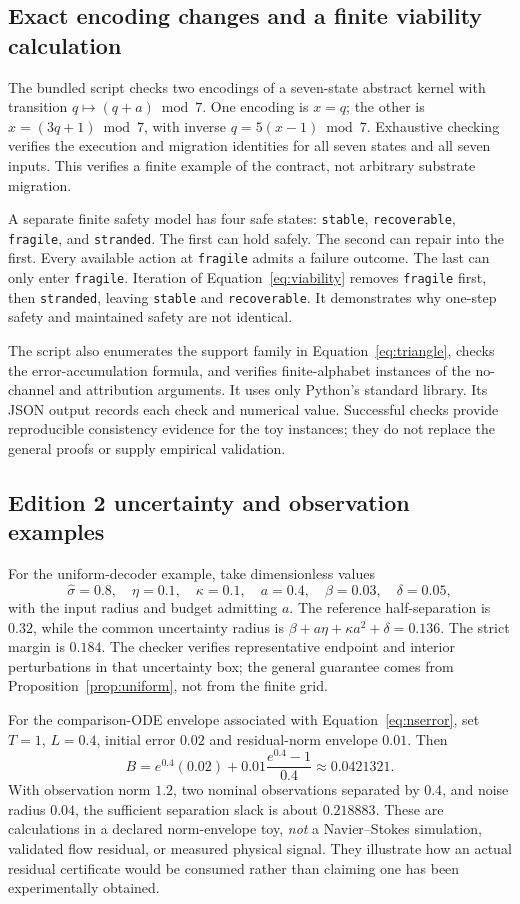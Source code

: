 \documentclass[11pt,a4paper]{article}
\theoremstyle{definition}
\theoremstyle{remark}
\begin{document}
\subsection{Exact encoding changes and a finite viability calculation}
The bundled script checks two encodings of a seven-state abstract kernel with transition $q\mapsto(q+a)\bmod7$. One encoding is $x=q$; the other is $x=(3q+1)\bmod7$, with inverse $q=5(x-1)\bmod7$. Exhaustive checking verifies the execution and migration identities for all seven states and all seven inputs. This verifies a finite example of the contract, not arbitrary substrate migration.

A separate finite safety model has four safe states: \texttt{stable}, \texttt{recoverable}, \texttt{fragile}, and \texttt{stranded}. The first can hold safely. The second can repair into the first. Every available action at \texttt{fragile} admits a failure outcome. The last can only enter \texttt{fragile}. Iteration of Equation~\eqref{eq:viability} removes \texttt{fragile} first, then \texttt{stranded}, leaving \texttt{stable} and \texttt{recoverable}. It demonstrates why one-step safety and maintained safety are not identical.

The script also enumerates the support family in Equation~\eqref{eq:triangle}, checks the error-accumulation formula, and verifies finite-alphabet instances of the no-channel and attribution arguments. It uses only Python's standard library. Its JSON output records each check and numerical value. Successful checks provide reproducible consistency evidence for the toy instances; they do not replace the general proofs or supply empirical validation.

\clearpage
\subsection{Edition 2 uncertainty and observation examples}
For the uniform-decoder example, take dimensionless values
\[
 \hat\sigma=0.8,\quad\eta=0.1,\quad\kappa=0.1,\quad
 a=0.4,\quad\beta=0.03,\quad\delta=0.05,
\]
with the input radius and budget admitting $a$. The reference half-separation is $0.32$, while the common uncertainty radius is
$\beta+a\eta+\kappa a^2+\delta=0.136$. The strict margin is $0.184$. The checker verifies representative endpoint and interior perturbations in that uncertainty box; the general guarantee comes from Proposition~\ref{prop:uniform}, not from the finite grid.

For the comparison-ODE envelope associated with Equation~\eqref{eq:nserror}, set $T=1$, $L=0.4$, initial error $0.02$ and residual-norm envelope $0.01$. Then
\[
 B=e^{0.4}(0.02)+0.01\frac{e^{0.4}-1}{0.4}\approx0.0421321.
\]
With observation norm $1.2$, two nominal observations separated by $0.4$, and noise radius $0.04$, the sufficient separation slack is about $0.218883$. These are calculations in a declared norm-envelope toy, \emph{not} a Navier--Stokes simulation, validated flow residual, or measured physical signal. They illustrate how an actual residual certificate would be consumed rather than claiming one has been experimentally obtained.
\end{document}
